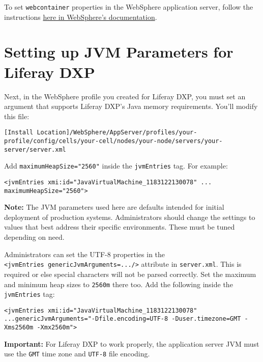 To set \texttt{webcontainer} properties in the WebSphere application
server, follow the instructions
\href{http://www-01.ibm.com/support/docview.wss?rss=180&uid=swg21284395}{here
in WebSphere's documentation}.

\section{Setting up JVM Parameters for Liferay
DXP}\label{setting-up-jvm-parameters-for-liferay-dxp}

Next, in the WebSphere profile you created for Liferay DXP, you must set
an argument that supports Liferay DXP's Java memory requirements. You'll
modify this file:

\begin{verbatim}
[Install Location]/WebSphere/AppServer/profiles/your-profile/config/cells/your-cell/nodes/your-node/servers/your-server/server.xml
\end{verbatim}

Add \texttt{maximumHeapSize="2560"} inside the \texttt{jvmEntries} tag.
For example:

\begin{verbatim}
<jvmEntries xmi:id="JavaVirtualMachine_1183122130078" ... maximumHeapSize="2560">
\end{verbatim}

\noindent\hrulefill

\textbf{Note:} The JVM parameters used here are defaults intended for
initial deployment of production systems. Administrators should change
the settings to values that best address their specific environments.
These must be tuned depending on need.

\noindent\hrulefill

Administrators can set the UTF-8 properties in the
\texttt{\textless{}jvmEntries\ genericJvmArguments=.../\textgreater{}}
attribute in \texttt{server.xml}. This is required or else special
characters will not be parsed correctly. Set the maximum and minimum
heap sizes to \texttt{2560m} there too. Add the following inside the
\texttt{jvmEntries} tag:

\begin{verbatim}
<jvmEntries xmi:id="JavaVirtualMachine_1183122130078" ...genericJvmArguments="-Dfile.encoding=UTF-8 -Duser.timezone=GMT -Xms2560m -Xmx2560m">
\end{verbatim}

\noindent\hrulefill

\textbf{Important:} For Liferay DXP to work properly, the application
server JVM must use the \texttt{GMT} time zone and \texttt{UTF-8} file
encoding.

